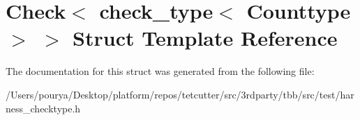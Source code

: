 \hypertarget{structCheck_3_01check__type_3_01Counttype_01_4_01_4}{}\section{Check$<$ check\+\_\+type$<$ Counttype $>$ $>$ Struct Template Reference}
\label{structCheck_3_01check__type_3_01Counttype_01_4_01_4}


The documentation for this struct was generated from the following file\+:\begin{DoxyCompactItemize}
\item 
/\+Users/pourya/\+Desktop/platform/repos/tetcutter/src/3rdparty/tbb/src/test/harness\+\_\+checktype.\+h\end{DoxyCompactItemize}
